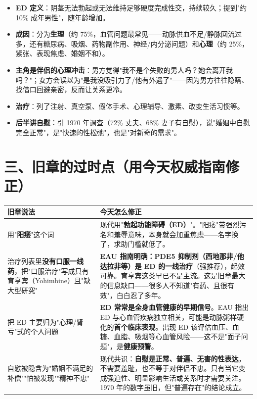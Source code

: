 \documentclass[12pt,UTF8,openany]{ctexbook}
\begin{document}
\begin{itemize}
  \item \textbf{ED 定义}：阴茎无法勃起或无法维持足够硬度完成性交，持续较久；提到"约 10\% 成年男性"，随年龄增加。
  \item \textbf{成因}：分为\textbf{生理}（约 75\%，血管问题最常见——动脉供血不足/静脉回流过多，还有糖尿病、吸烟、药物副作用、神经/内分泌问题）和\textbf{心理}（约 25\%，紧张、表现焦虑、婚姻不和）。
  \item \textbf{主角是伴侣的心理冲击}：男方觉得"我不是个失败的男人吗？她会离开我吗？"；女方会误以为"是我没吸引力了/他有外遇了"——因为男方往往隐瞒、找借口回避亲密，反而让关系更冷。
  \item \textbf{治疗}：列了注射、真空泵、假体手术、心理辅导、激素、改变生活习惯等。
  \item \textbf{后半讲自慰}：引 1970 年调查（72\% 丈夫、68\% 妻子有自慰），说"婚姻中自慰完全正常"，是"快速的性松弛"，也是"对新奇的需求"。
\end{itemize}

\section{三、旧章的过时点（用今天权威指南修正）}

\begin{tabularx}{\textwidth}{lX}
\toprule
\textbf{旧章说法} & \textbf{今天怎么修正} \\
\midrule
用"\textbf{阳痿}"这个词 & 现代用"\textbf{勃起功能障碍（ED）}"。"阳痿"带强烈污名和羞辱意味，本身就会加重焦虑——名字换了，求助门槛就低了。 \\
治疗列表里\textbf{没有口服一线药}，把"口服治疗"写成只有育亨宾（Yohimbine）且"缺大型研究" & \textbf{EAU 指南明确：PDE5 抑制剂（西地那非/他达拉非等）是 ED 的一线治疗}（强推荐），起效可靠。育亨宾这类早已不是主流。这是旧章最大的信息缺口——很多人不知道"有药、且很有效"，白白忍了多年。 \\
把 ED 主要归为"心理/肾亏"式的个人问题 & \textbf{ED 常常是全身血管健康的早期信号}。EAU 指出 ED 与心血管疾病独立相关，可能是动脉粥样硬化的\textbf{首个临床表现}。出现 ED 该评估血压、血糖、血脂、吸烟等心血管风险——这不是"面子问题"，是\textbf{健康预警}。 \\
自慰被隐含为"婚姻不满足的补偿""怕被发现""精神不忠" & 现代共识：\textbf{自慰是正常、普遍、无害的性表达}，不需要羞耻，也不等于对伴侣不忠。只有当它变成强迫性、明显影响生活或关系时才需要关注。1970 年的数字虽旧，但"普遍存在"的结论成立。 \\
\bottomrule
\end{tabularx}
\end{document}

